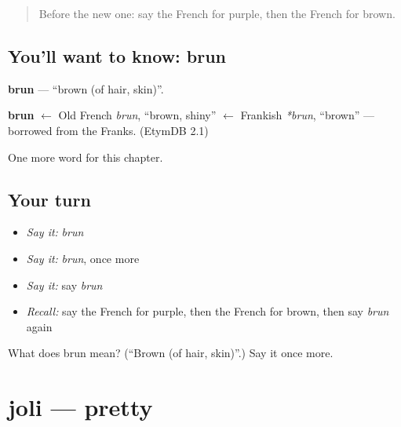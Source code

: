 \label{lesson:FR-C130-brun}



\begin{quote}
Before the new one: say the French for purple, then the French for brown.
\end{quote}

\subsection*{You'll want to know: brun}
\textbf{brun} — \textquotedblleft{}brown (of hair, skin)\textquotedblright{}.

\begin{cousinweb}
\textbf{brun} $\leftarrow$ Old French \emph{brun}, \textquotedblleft{}brown, shiny\textquotedblright{} $\leftarrow$ Frankish \emph{*brun}, \textquotedblleft{}brown\textquotedblright{} — borrowed from the Franks. (EtymDB 2.1)
\end{cousinweb}

\begin{grammarlens}[title={What you've built}]
One more word for this chapter.
\end{grammarlens}

\subsection*{Your turn}
\begin{itemize}
\raggedright
  \item \emph{Say it:} \emph{brun}
  \item \emph{Say it:} \emph{brun}, once more
  \item \emph{Say it:} say \emph{brun}
  \item \emph{Recall:} say the French for purple, then the French for brown, then say \emph{brun} again
\end{itemize}

\begin{tcolorbox}[breakable,colback=teal!4,colframe=teal!35!black,title={Before you move on}]
What does brun mean? (\textquotedblleft{}Brown (of hair, skin)\textquotedblright{}.) Say it once more.
\end{tcolorbox}
\section[joli]{joli — pretty}

\label{lesson:FR-C130-joli}



